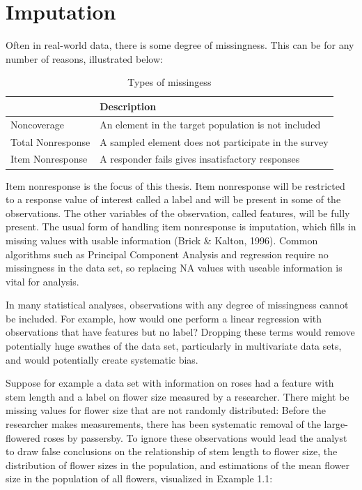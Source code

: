 \documentclass[12pt,twoside]{reedthesis}
\begin{document}
\section{Imputation}\label{imputation}

Often in real-world data, there is some degree of missingness. This can
be for any number of reasons, illustrated below:
\begin{table}[t]

\caption{\label{tab:missingness}Types of missingess}
\centering
\begin{tabular}{l|l}
\hline
  & Description\\
\hline
Noncoverage & An element in the target population is not included\\
\hline
Total Nonresponse & A sampled element does not participate in the survey\\
\hline
Item Nonresponse & A responder fails gives insatisfactory responses\\
\hline
\end{tabular}
\end{table}
Item nonresponse is the focus of this thesis. Item nonresponse will be
restricted to a response value of interest called a label and will be
present in some of the observations. The other variables of the
observation, called features, will be fully present. The usual form of
handling item nonresponse is imputation, which fills in missing values
with usable information (Brick \& Kalton, 1996). Common algorithms such
as Principal Component Analysis and regression require no missingness in
the data set, so replacing NA values with useable information is vital
for analysis.

In many statistical analyses, observations with any degree of
missingness cannot be included. For example, how would one perform a
linear regression with observations that have features but no label?
Dropping these terms would remove potentially huge swathes of the data
set, particularly in multivariate data sets, and would potentially
create systematic bias.

Suppose for example a data set with information on roses had a feature
with stem length and a label on flower size measured by a researcher.
There might be missing values for flower size that are not randomly
distributed: Before the researcher makes measurements, there has been
systematic removal of the large-flowered roses by passersby. To ignore
these observations would lead the analyst to draw false conclusions on
the relationship of stem length to flower size, the distribution of
flower sizes in the population, and estimations of the mean flower size
in the population of all flowers, visualized in Example 1.1:
\end{document}
